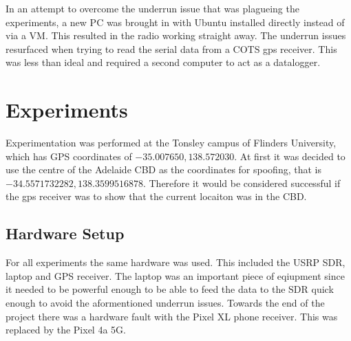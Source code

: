In an attempt to overcome the underrun issue that was plagueing the experiments, a new PC was brought in with Ubuntu installed directly instead of via a VM. This resulted
in the radio working straight away. The underrun issues resurfaced when trying to read the serial data from a COTS gps receiver. This was less than ideal and required a
second computer to act as a datalogger.

\section{Experiments}
Experimentation was performed at the Tonsley campus of Flinders University, which has GPS coordinates of $-35.007650, 138.572030$. At first it was decided to use the
centre of the Adelaide CBD as the coordinates for spoofing, that is $-34.5571732282, 138.3599516878$. Therefore it would be considered successful if the gps receiver was to show
that the current locaiton was in the CBD.

\subsection{Hardware Setup}
For all experiments the same hardware was used. This included the USRP SDR, laptop and GPS receiver. The laptop was an important piece of eqiupment since it needed to be
powerful enough to be able to feed the data to the SDR quick enough to avoid the aformentioned underrun issues. Towards the end of the project there was a hardware fault
with the Pixel XL phone receiver. This was replaced by the Pixel 4a 5G.

